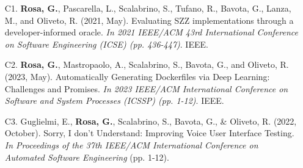      \begin{itemize}
      \item[C1.] \textbf{Rosa, G.}, Pascarella, L., Scalabrino, S., Tufano, R., Bavota, G., Lanza, M., and Oliveto, R. (2021, May). Evaluating SZZ implementations through a developer-informed oracle. \emph{In 2021 IEEE/ACM 43rd International Conference on Software Engineering (ICSE) (pp. 436-447)}. IEEE.
      \item[C2.] \textbf{Rosa, G.}, Mastropaolo, A., Scalabrino, S., Bavota, G., and Oliveto, R. (2023, May). Automatically Generating Dockerfiles via Deep Learning: Challenges and Promises. \emph{In 2023 IEEE/ACM International Conference on Software and System Processes (ICSSP) (pp. 1-12)}. IEEE.
      \item[C3.] Guglielmi, E., \textbf{Rosa, G.}, Scalabrino, S., Bavota, G., & Oliveto, R. (2022, October). Sorry, I don't Understand: Improving Voice User Interface Testing. \emph{In Proceedings of the 37th IEEE/ACM International Conference on Automated Software Engineering} (pp. 1-12).
     \end{itemize}
